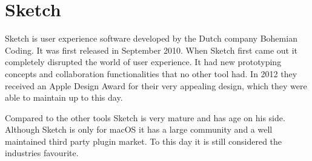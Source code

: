 \section{Sketch}\label{explanation-tools-sketch}
Sketch is user experience software developed by the Dutch company Bohemian Coding. It was first released in September 2010. When Sketch first came out it completely disrupted the world of user experience. It had new prototyping concepts and collaboration functionalities that no other tool had. In 2012 they received an Apple Design Award for their very appealing design, which they were able to maintain up to this day.

Compared to the other tools Sketch is very mature and has age on his side. Although Sketch is only for macOS it has a large community and a well maintained third party plugin market. To this day it is still considered the industries favourite.
